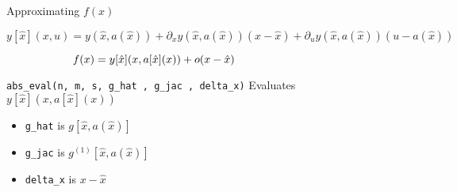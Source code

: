 \documentclass{beamer}
\begin{document}
\begin{frame}{Approximating $f(x)$}

\[
y[ \hat{x} ]( x , u )
=
y ( \hat{x}, a( \hat{x} ) )
	+ \partial_x y ( \hat{x}, a( \hat{x} ) ) ( x - \hat{x} )
	+ \partial_u y ( \hat{x}, a( \hat{x} ) ) ( u - a( \hat{x} ) )
\]
\pause


\[
f(x) = y[ \hat{x} ] ( x , a[ \hat{x} ] (x) ) + o ( x - \hat{x} )
\phantom{\rule{1.3in}{1pt}}
\]

\begin{block}{ \texttt{abs\_eval(n, m, s, g\_hat , g\_jac , delta\_x)} }
Evaluates $y[ \hat{x} ] ( x , a[ \hat{x} ] (x) )$
\end{block}
\pause

\begin{itemize}

\item
\texttt{g\_hat} is $g[ \hat{x} , a( \hat{x} ) ]$
\pause

\item
\texttt{g\_jac} is $g^{(1)} [ \hat{x} , a( \hat{x} ) ]$
\pause

\item
\texttt{delta\_x} is $x - \hat{x}$

\end{itemize}


\end{frame}
\end{document}
